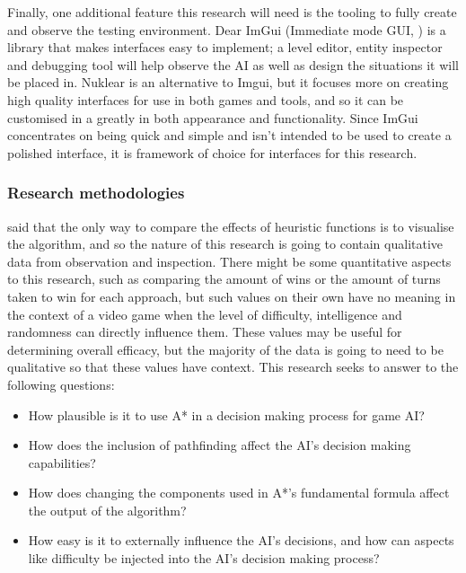 \documentclass[11pt, a4paper]{article}
\begin{document}
Finally, one additional feature this research will need is the tooling to fully create and observe the testing environment. Dear ImGui (Immediate mode GUI, \cite{Imgui}) is a library that makes interfaces easy to implement; a level editor, entity inspector and debugging tool will help observe the AI as well as design the situations it will be placed in. Nuklear \parencite{Nuklear} is an alternative to Imgui, but it focuses more on creating high quality interfaces for use in both games and tools, and so it can be customised in a greatly in both appearance and functionality. Since ImGui concentrates on being quick and simple and isn't intended to be used to create a polished interface, it is framework of choice for interfaces for this research.

\subsubsection{Research methodologies}
\label{subsubsec:researchMethodologies}

\citeauthor{millington2019ai} \parencite*[236]{millington2019ai} said that the only way to compare the effects of heuristic functions is to visualise the algorithm, and so the nature of this research is going to contain qualitative data from observation and inspection. There might be some quantitative aspects to this research, such as comparing the amount of wins or the amount of turns taken to win for each approach, but such values on their own have no meaning in the context of a video game when the level of difficulty, intelligence and randomness can directly influence them. These values may be useful for determining overall efficacy, but the majority of the data is going to need to be qualitative so that these values have context. This research seeks to answer to the following questions:

\begin{itemize}
\item How plausible is it to use A* in a decision making process for game AI?
\item How does the inclusion of pathfinding affect the AI's decision making capabilities?
\item How does changing the components used in A*'s fundamental formula affect the output of the algorithm?
\item How easy is it to externally influence the AI's decisions, and how can aspects like difficulty be injected into the AI's decision making process?
\end{itemize}
\end{document}
